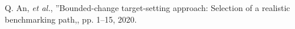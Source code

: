 
Q. An, \MakeLowercase{\textit{et al.}}, ''Bounded-change target-setting approach: Selection of a realistic benchmarking path,, pp. 1--15, 2020.